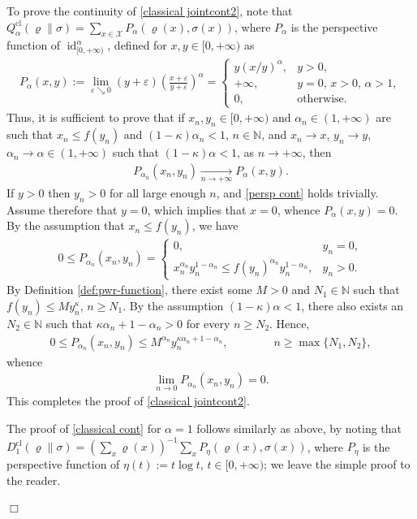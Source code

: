 \documentclass[unsortedaddress,superscriptaddress,pra,notitlepage]{revtex4}
\newenvironment{proof}[1][Proof]{\begin{trivlist}
\item[\hskip \labelsep {\bfseries #1}]}{\hfill$\Box$\end{trivlist}}
\def\X{{\mathcal X}}
\def\bN{\mathbb{N}}
\def\ep{\varepsilon}
\def\rho{\varrho}
\def\bz{\left(}
\def\jz{\right)}
\def\inv{^{-1}}
\def\cl{\mathrm{cl}}
\def\cl{\mathrm{cl}}
\def\pwr{\kappa}
\newcommand{\ds}{\mbox{ }\mbox{ }}
\DeclareMathOperator{\id}{id}
\begin{document}
\begin{proof}
To prove the continuity of \eqref{classical jointcont2},
note that $Q_{\alpha}^{\cl}(\rho\|\sigma)=\sum_{x\in\X}P_{\alpha}(\rho(x),\sigma(x))$,
where $P_{\alpha}$ is the perspective function of $\id_{[0,+\infty)}^{\alpha}$, defined for $x,y\in[0,+\infty)$ as
\begin{align*}
P_{\alpha}(x,y):=\lim_{\ep\searrow 0}(y+\ep)\bz\frac{x+\ep}{y+\ep}\jz^{\alpha}
=\begin{cases}
y(x/y)^{\alpha},& y>0,\\
+\infty,&y=0,\, x>0,\, \alpha>1,\\
0,&\text{otherwise}.
\end{cases}
\end{align*}
Thus, it is sufficient to prove that if $x_n,y_n\in[0,+\infty)$ and $\alpha_n\in(1,+\infty)$ are such that $x_n\le f(y_n)$ and $(1-\pwr)\alpha_n<1$, $n\in\bN$, and
$x_n\to x$, $y_n\to y$, $\alpha_n\to\alpha\in(1,+\infty)$
such that $(1-\pwr)\alpha<1$,
as $n\to+\infty$, then 
\begin{align}\label{persp cont}
P_{\alpha_n}(x_n,y_n)\xrightarrow[n\to+\infty]{}P_{\alpha}(x,y).
\end{align}
If $y>0$ then $y_n>0$ for all large enough $n$, and \eqref{persp cont} holds
trivially. Assume therefore that $y=0$, which implies that $x=0$, whence $P_{\alpha}(x,y)=0$. 
By the assumption that $x_n\le f(y_n)$, we have 
\begin{align*}
0\le P_{\alpha_n}(x_n,y_n)
=\begin{cases}
0,&y_n=0,\\
x_n^{\alpha_n}y_n^{1-\alpha_n}\le
f(y_n)^{\alpha_n}y_n^{1-\alpha_n},&y_n>0.
\end{cases}
\end{align*}
By Definition \ref{def:pwr-function}, there exist some $M>0$ and $N_1\in\bN$ such that $f(y_n)\le M y_n^{\pwr}$, $n\ge N_1$.
By the assumption $(1-\pwr)\alpha<1$, there also exists an $N_2\in\bN$ such that 
$\pwr\alpha_n+1-\alpha_n>0$ for every $n\ge N_2$. Hence,
\begin{align*}
0\le P_{\alpha_n}(x_n,y_n)\le M^{\alpha_n}y_n^{\pwr\alpha_n+1-\alpha_n},
\ds\ds\ds n\ge\max\{N_1,N_2\},
\end{align*}
whence
\begin{align*}
\lim_{n\to 0}P_{\alpha_n}(x_n,y_n)=0.
\end{align*}
This completes the proof of \eqref{classical jointcont2}.

The proof of \eqref{classical cont} for $\alpha=1$ follows similarly as above, by noting that $D_1^{\cl}(\rho\|\sigma)=(\sum_x\rho(x))\inv\sum_x P_{\eta}(\rho(x),\sigma(x))$, 
where $P_{\eta}$ is the perspective function of 
$\eta(t):=t\log t$, $t\in[0,+\infty)$; we leave the simple proof to the reader.


\end{proof}
\end{document}
